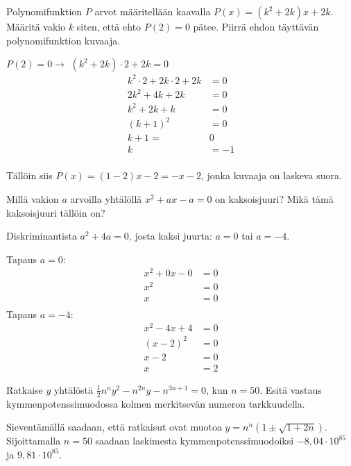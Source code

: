 \begin{tehtava}
Polynomifunktion $P$ arvot määritellään kaavalla $P(x)=(k^2+2k)x+2k$. Määritä vakio $k$ siten, että ehto $P(2)=0$ pätee. Piirrä ehdon täyttävän polynomifunktion kuvaaja.
	\begin{vastaus}
$P(2)=0 \rightarrow$ $(k^2+2k)\cdot 2+2k=0$
\begin{align*}
k^2\cdot 2+2k\cdot 2+2k&=0 \\
2k^2+4k+2k&=0 \\
k^2+2k+k&=0 \\
(k+1)^2&=0 \\
k+1=&0 \\
k&=-1  \\
\end{align*}

Tällöin siis $P(x)=(1-2)x-2=-x-2$, jonka kuvaaja on laskeva suora. %
	\end{vastaus}
\end{tehtava}

\begin{tehtava}
Millä vakion $a$ arvoilla yhtälöllä $x^2+ax-a=0$ on kaksoisjuuri? Mikä tämä kaksoisjuuri tällöin on?
	\begin{vastaus}
Diskriminantista $a^2+4a=0$, josta kaksi juurta: $a=0$ tai $a=-4$.

Tapaus $a=0$:
\begin{align*}
x^2+0x-0&=0 \\
x^2&=0 \\
x&=0 \\
\end{align*}
Tapaus $a=-4$:
\begin{align*}
x^2-4x+4&=0 \\
(x-2)^2&=0 \\
x-2&=0 \\
x&=2
\end{align*}
	\end{vastaus}
\end{tehtava}

\begin{tehtava}
Ratkaise $y$ yhtälöstä $\frac{1}{2}n^n y^2-n^{2n}y-n^{3n+1}=0$, kun $n=50$. Esitä vastaus kymmenpotenssimuodossa kolmen merkitsevän numeron tarkkuudella.
	\begin{vastaus}
	Sieventämällä saadaan, että ratkaisut ovat muotoa $y=n^n (1\pm \sqrt{1+2n})$. Sijoittamalla $n=50$ saadaan laskimesta kymmenpotenssimuodoiksi $-8,04\cdot 10^{85}$ ja $9,81\cdot 10^{85}$.
	\end{vastaus}
\end{tehtava}

